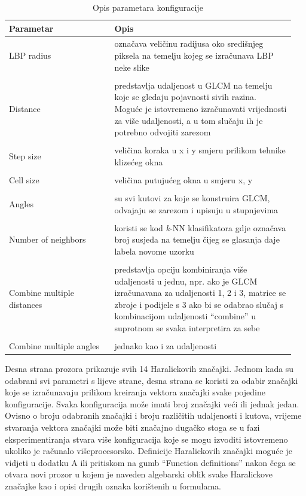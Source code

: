 \documentclass[times, utf8, zavrsni]{fer}
\begin{document}
\begin{table}
\begin{tabular}{p{0.35\linewidth} | p{0.6\linewidth}}
Parametar & Opis \\
\hline
LBP radius & označava veličinu radijusa oko središnjeg piksela
na temelju kojeg se izračunava LBP neke slike \\

\\
\hline
Distance & predstavlja udaljenost u GLCM na temelju koje 
se gledaju pojavnosti sivih razina. Moguće je istovremeno izračunavati vrijednosti
za više udaljenosti, a u tom slučaju ih je potrebno odvojiti zarezom \\

\\
\hline
Step size & veličina koraka u x i y smjeru prilikom tehnike klizećeg okna \\

\\
\hline
Cell size & veličina putujućeg okna u smjeru x, y \\

\\
\hline
Angles & su svi kutovi za koje se konstruira GLCM, odvajaju
se zarezom i upisuju u stupnjevima \\

\\
\hline
Number of neighbors & koristi se kod \textit{k}-NN klasifikatora
gdje označava broj susjeda na temelju čijeg se glasanja daje labela novome uzorku \\

\\
\hline
Combine multiple distances & predstavlja opciju kombiniranja više
udaljenosti u jednu, npr. ako je GLCM izračunavana za udaljenosti 1, 2 i 3, matrice
se zbroje i podijele s 3 ako bi se odabrao slučaj s kombinacijom udaljenosti \enquote{combine}
u suprotnom se svaka interpretira za sebe \\

\\
\hline
Combine multiple angles & jednako kao i za udaljenosti

\end{tabular}
\caption{Opis parametara konfiguracije}
\end{table}

\bigbreak

Desna strana prozora prikazuje svih 14 Haralickovih značajki. Jednom kada 
su odabrani svi parametri s lijeve strane, desna strana se koristi za odabir 
značajki koje se izračunavaju prilikom kreiranja vektora značajki svake pojedine
konfiguracije. Svaka konfiguracija može imati broj značajki veći ili jednak jedan. 
Ovisno o broju odabranih značajki i broju različitih udaljenosti i kutova, vrijeme
stvaranja vektora značajki može biti značajno dugačko stoga se u fazi eksperimentiranja
stvara više konfiguracija koje se mogu izvoditi istovremeno ukoliko je računalo
višeprocesorsko. Definicije Haralickovih značajki moguće je vidjeti u dodatku A
ili pritiskom na gumb \enquote{Function definitions} nakon čega se otvara novi
prozor u kojem je naveden algebarski oblik svake Haralickove značajke kao i 
opisi drugih oznaka korištenih u formulama. 
\end{document}
